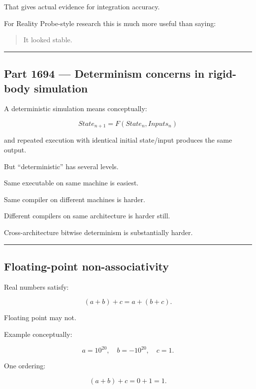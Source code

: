 That gives actual evidence for integration accuracy.

For Reality Probe-style research this is much more useful than saying:

\begin{quote}
It looked stable.
\end{quote}

\begin{center}\rule{0.5\linewidth}{0.5pt}\end{center}

\subsection{Part 1694 --- Determinism concerns in rigid-body simulation}\label{06-engine-ii-ch039-part-1694-determinism-concerns-in-rigid-body-simulation}

A deterministic simulation means conceptually:

\[
\boxed{
State_{n+1}
=
F(State_n,Inputs_n)
}
\]

and repeated execution with identical initial state/input produces the same output.

But ``deterministic'' has several levels.

Same executable on same machine is easiest.

Same compiler on different machines is harder.

Different compilers on same architecture is harder still.

Cross-architecture bitwise determinism is substantially harder.

\begin{center}\rule{0.5\linewidth}{0.5pt}\end{center}

\subsection{Floating-point non-associativity}\label{06-engine-ii-ch039-floating-point-non-associativity}

Real numbers satisfy:

\[
(a+b)+c
=
a+(b+c).
\]

Floating point may not.

Example conceptually:

\[
a=10^{20},
\quad
b=-10^{20},
\quad
c=1.
\]

One ordering:

\[
(a+b)+c
=
0+1
=
1.
\]

